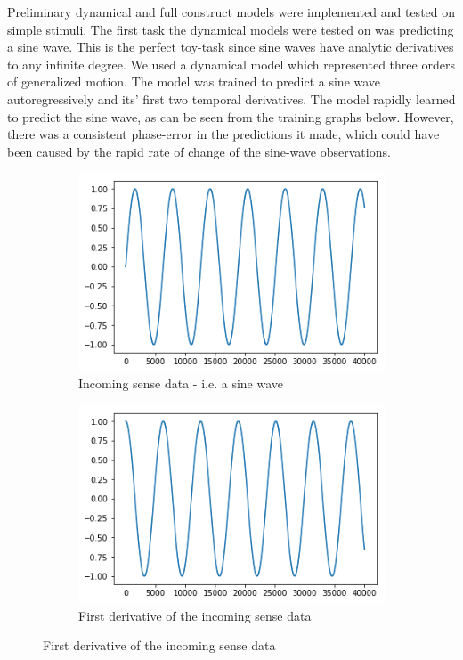 Preliminary dynamical and full construct models were implemented and tested on simple stimuli. The first task the dynamical models were tested on was predicting a sine wave. This is the perfect toy-task since sine waves have analytic derivatives to any infinite degree. We used a dynamical model which represented three orders of generalized motion. The model was trained to predict a sine wave autoregressively and its' first two temporal derivatives. The model rapidly learned to predict the sine wave, as can be seen from the training graphs below. However, there was a consistent phase-error in the predictions it made, which could have been caused by the rapid rate of change of the sine-wave observations.

\begin{figure}[H]
\centering
\begin{subfigure}{.32\linewidth}
 \centering
 \includegraphics[width=0.8\linewidth]{chapter_3_figures/dynamics_sine_wave_phi.png}
 \caption{Incoming sense data - i.e. a sine wave}
\end{subfigure}
 \hfill
\begin{subfigure}{.32\linewidth}
 \centering
 \includegraphics[width=0.8\linewidth]{chapter_3_figures/dynamics_sine_wave_phidot.png}
 \caption{First derivative of the incoming sense data}
\end{subfigure}


\end{figure}

